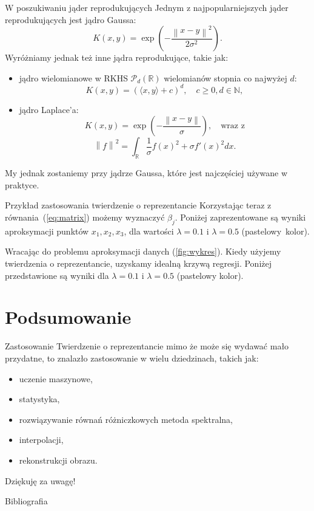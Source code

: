 \documentclass{beamer}
\newcommand{\imagestandard}[1]{\texttt{[image: \#1]}}
\newcommand{\norm}[1]{\left\lVert#1\right\rVert}
\newcommand{\bb}[1]{\ensuremath{\mathbb{#1}}}
\begin{document}
\begin{frame}[allowframebreaks]{W poszukiwaniu jąder reprodukujących}
  Jednym z najpopularniejszych jąder reprodukujących jest jądro Gaussa:
  \[
    K(x, y) = \exp{\left(-\dfrac{\norm{x - y}^2}{2\sigma^2}\right)}.
  \]
  Wyróżniamy jednak też inne jądra reprodukujące, takie jak:
  \begin{itemize}
    \item jądro wielomianowe w RKHS $\mathcal{P}_d(\bb{R})$ wielomianów stopnia co najwyżej $d$:
    \[
      K(x, y) = (\langle x, y\rangle + c)^d, \quad c \geq 0, d \in \bb{N},
    \]
    \item jądro Laplace'a: 
    \[
      K(x, y) = \exp{\left(-\dfrac{\norm{x - y}}{\sigma}\right)}, \quad \text{wraz z}
    \] 
    \[
      \norm{f}^2 = \int_{\bb{R}}\frac{1}{\sigma}{f(x)^2 + \sigma f'(x)^2dx}.
    \]
  \end{itemize}
  My jednak zostaniemy przy jądrze Gaussa, które jest najczęściej używane w praktyce.
\end{frame}

\begin{frame}{Przykład zastosowania twierdzenie o reprezentancie}
  Korzystając teraz z równania~(\ref{eq:matrix}) możemy wyznaczyć $\beta_j$. Poniżej zaprezentowane są wyniki aproksymacji punktów $x_1, x_2, x_3$, dla wartości $\lambda = 0.1$ i $\lambda = 0.5$ (pastelowy~kolor).
  \begin{figure}
    \centering
    \only<1>{\imagestandard{wykres6.png}}
  \end{figure}
\end{frame}

\begin{frame}
Wracając do problemu aproksymacji danych (\ref{fig:wykres}). Kiedy użyjemy twierdzenia o reprezentancie, uzyskamy idealną krzywą regresji. Poniżej przedstawione są wyniki dla $\lambda = 0.1$ i $\lambda = 0.5$ (pastelowy kolor).
\begin{figure}
  \centering
  \only<1>{\imagestandard{wykres7.png}}
\end{figure}

\end{frame}
\section{Podsumowanie}
\begin{frame}{Zastosowanie}
  Twierdzenie o reprezentancie mimo że może się wydawać mało przydatne, to znalazło zastosowanie w wielu dziedzinach, takich jak:
  \begin{itemize}
    \item<1-> uczenie maszynowe,
    \item<2-> statystyka,
    \item<3-> rozwiązywanie równań różniczkowych \textendash{} metoda spektralna,
    \item<4-> interpolacji,
    \item<5-> rekonstrukcji obrazu.
  \end{itemize}
\end{frame}

\begin{frame}{ }
  Dziękuję za uwagę!
\end{frame}

\begin{frame}[allowframebreaks]{Bibliografia}
    \nocite{*}
    \printbibliography{}
\end{frame} 
\end{document}
